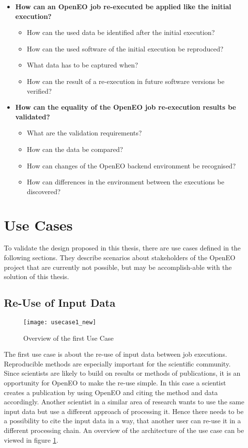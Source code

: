 \documentclass[draft,final]{vutinfth} %
\begin{document}
\begin{itemize}
	\item \textbf{How can an OpenEO job re-executed be applied like the initial execution?}
	\begin{itemize}
		\item How can the used data be identified after the initial execution?
		\item How can the used software of the initial execution be reproduced?
		\item What data has to be captured when?
		\item How can the result of a re-execution in future software versions be verified?
	\end{itemize}
	\item \textbf{How can the equality of the OpenEO job re-execution results be validated?}
	\begin{itemize}
		\item What are the validation requirements?
		\item How can the data be compared?
		\item How can changes of the OpenEO backend environment be recognised?
		\item How can differences in the environment between the executions be discovered?
	\end{itemize}
\end{itemize}

\section{Use Cases}\label{Use Cases}
To validate the design proposed in this thesis, there are use cases defined in the following sections. They describe scenarios about stakeholders of the OpenEO project that are currently not possible, but may be accomplish-able with the solution of this thesis.
    
\subsection{Re-Use of Input Data}\label{UseCase1}
\begin{figure}[h]
	\centering
	\texttt{[image: usecase1\_new]}
	\caption{Overview of the first Use Case}
	\label{fig:usecase1} %
\end{figure}
The first use case is about the re-use of input data between job executions. Reproducible methods are especially important for the scientific community. Since scientists are likely to build on results or methods of publications, it is an opportunity for OpenEO to make the re-use simple. In this case a scientist creates a publication by using OpenEO and citing the method and data accordingly. Another scientist in a similar area of research wants to use the same input data but use a different approach of processing it. Hence there needs to be a possibility to cite the input data in a way, that another user can re-use it in a different processing chain. 
An overview of the architecture of the use case can be viewed in figure \ref{fig:usecase1}.
\end{document}
